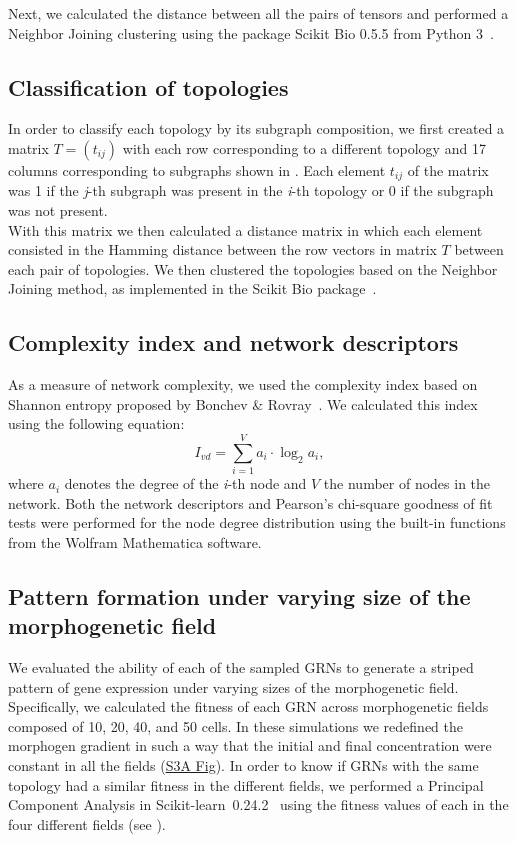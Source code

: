 \documentclass[10pt,letterpaper]{article}
\begin{document}
Next, we calculated the distance between all the pairs of tensors and performed
a Neighbor Joining clustering using the package Scikit Bio 0.5.5 from
Python 3~\cite{skbio2020}.

\subsection*{Classification of topologies}

In order to classify each topology by its subgraph composition, we first created
a matrix  $T = (t_{ij})$ with each row corresponding to a different topology
and 17 columns corresponding to subgraphs shown in .
Each element $t_{ij}$ of
the matrix was 1 if the \emph{j}-th subgraph was present in the \emph{i}-th
topology or 0 if the subgraph was not present.\\

With this matrix we then calculated a distance matrix in which each element
consisted in the Hamming distance between the row vectors in matrix $T$ between
each pair of topologies. We then clustered the topologies based on the
Neighbor Joining method, as implemented in the Scikit Bio
package~\cite{skbio2020}.

\subsection*{Complexity index and network descriptors}

As a measure of network complexity, we used the complexity index based on
Shannon entropy proposed by Bonchev \& Rovray~\cite{D.2005}. We calculated this
index using the following equation:
\begin{equation}
 I_{vd} = \sum_{i=1}^V a_i \cdot \log_{2} a_i,
\end{equation}
\noindent
where $a_i$ denotes the degree of the \emph{i}-th node and $V$ the number of
nodes in the network. Both the network descriptors and Pearson’s chi-square
goodness of fit tests were performed for the node degree distribution using
the built-in functions from the Wolfram Mathematica software.\\

\subsection*{Pattern formation under varying size of the morphogenetic field}
We evaluated the ability of each of the sampled GRNs to generate a striped
pattern of gene expression under varying sizes of the morphogenetic field.
Specifically, we calculated the fitness of each GRN across morphogenetic fields
composed of 10, 20, 40, and 50 cells. In these simulations we redefined the
morphogen gradient in such a way that the initial and final concentration were
constant in all the fields (\hyperref[S3_Fig]{S3A Fig}). In order to know if GRNs
with the same topology had a similar fitness in the different fields, we performed
a Principal Component Analysis in Scikit-learn~0.24.2~\cite{sklearn} using the
fitness values of each in the four different fields (see ).
\end{document}
